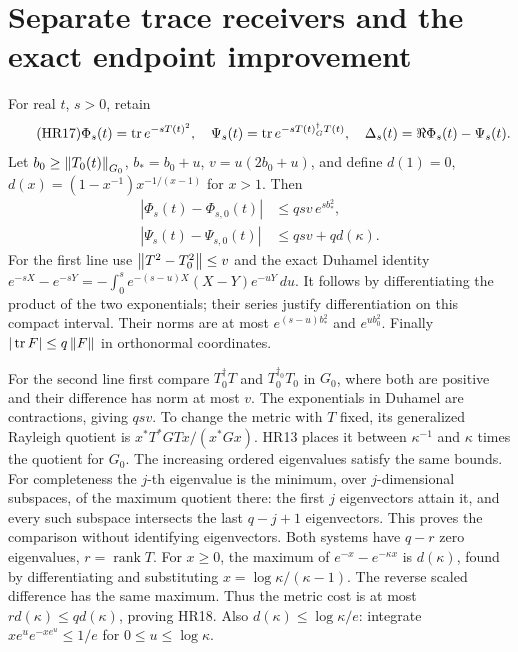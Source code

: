 \documentclass[11pt]{article}
\begin{document}
\section{Separate trace receivers and the exact endpoint improvement}

For real \(t\), \(s>0\), retain
\begin{equation}\tag{HR17}\label{hrv:HR17}
\Phi_s(t)=\operatorname{tr} e^{-sT(t)^2},\quad
\Psi_s(t)=\operatorname{tr} e^{-sT(t)^\dagger_G T(t)},\quad
\Delta_s(t)=\Re\Phi_s(t)-\Psi_s(t).
\end{equation}
Let \(b_0\ge\left\lVert T_0(t)\right\rVert_{G_0}\), \(b_*=b_0+u\),
\(v=u(2b_0+u)\), and define
\(d(1)=0\), \(d(x)=(1-x^{-1})x^{-1/(x-1)}\) for \(x>1\).
Then
\begin{equation}\tag{HR18}\label{hrv:HR18}
\begin{split}
|\Phi_s(t)-\Phi_{s,0}(t)|&\le qsv\,e^{s b_*^2},\\
|\Psi_s(t)-\Psi_{s,0}(t)|&\le qsv+q d(\kappa).
\end{split}
\end{equation}
For the first line use \(\left\lVert T^2-T_0^2\right\rVert\le v\) and the exact
Duhamel identity
\(e^{-sX}-e^{-sY}=-\int_0^s e^{-(s-u)X}(X-Y)e^{-uY}\,du\).
It follows by differentiating the product of the two exponentials;
their series justify differentiation on this compact interval.
Their norms are at most \(e^{(s-u)b_*^2}\) and \(e^{ub_0^2}\).
Finally \(|\operatorname{tr} F|\le q\left\lVert F\right\rVert\) in orthonormal coordinates.

For the second line first compare \(T^\dagger_0T\) and
\(T_0^{\dagger_0}T_0\) in \(G_0\), where both are positive and their
difference has norm at most \(v\). The exponentials in Duhamel are
contractions, giving \(qsv\). To change the metric with \(T\) fixed,
its generalized Rayleigh quotient is
\(x^*T^*GTx/(x^*Gx)\). HR13 places it between \(\kappa^{-1}\) and
\(\kappa\) times the quotient for \(G_0\). The increasing ordered
eigenvalues satisfy the same bounds. For completeness the \(j\)-th
eigenvalue is the minimum, over \(j\)-dimensional subspaces, of the
maximum quotient there: the first \(j\) eigenvectors attain it, and
every such subspace intersects the last \(q-j+1\) eigenvectors.
This proves the comparison without identifying eigenvectors.
Both systems have \(q-r\) zero eigenvalues, \(r=\operatorname{rank}T\).
For \(x\ge0\), the maximum of \(e^{-x}-e^{-\kappa x}\) is
\(d(\kappa)\), found by differentiating and substituting
\(x=\log\kappa/(\kappa-1)\). The reverse scaled difference has
the same maximum. Thus the metric cost is at most
\(r d(\kappa)\le qd(\kappa)\), proving HR18.
Also \(d(\kappa)\le\log\kappa/e\): integrate
\(xe^u e^{-xe^u}\le1/e\) for \(0\le u\le\log\kappa\).
\end{document}
